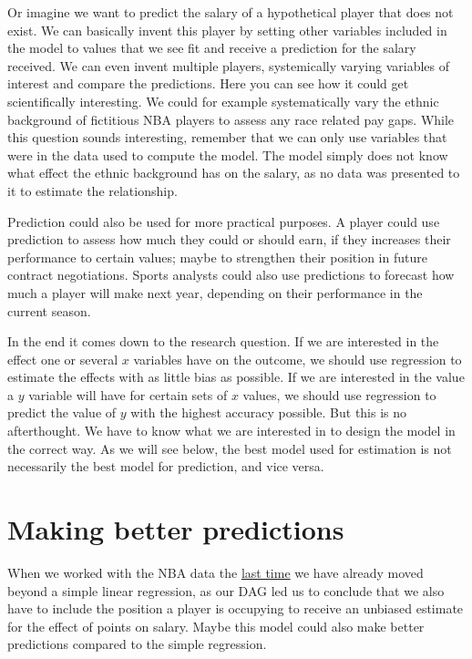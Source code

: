 \documentclass[
]{book}
\begin{document}
Or imagine we want to predict the salary of a hypothetical player that does not
exist. We can basically invent this player by setting other variables included
in the model to values that we see fit and receive a prediction for the salary
received. We can even invent multiple players, systemically varying variables of
interest and compare the predictions. Here you can see how it could get
scientifically interesting. We could for example systematically vary the ethnic
background of fictitious NBA players to assess any race related pay gaps. While
this question sounds interesting, remember that we can only use variables that
were in the data used to compute the model. The model simply does not know what
effect the ethnic background has on the salary, as no data was presented to it
to estimate the relationship.

Prediction could also be used for more practical purposes. A player could use
prediction to assess how much they could or should earn, if they increases their
performance to certain values; maybe to strengthen their position in future
contract negotiations. Sports analysts could also use predictions to forecast
how much a player will make next year, depending on their performance in the
current season.

In the end it comes down to the research question. If we are interested in the
effect one or several \(x\) variables have on the outcome, we should use
regression to estimate the effects with as little bias as possible. If we are
interested in the value a \(y\) variable will have for certain sets of \(x\) values,
we should use regression to predict the value of \(y\) with the highest accuracy
possible. But this is no afterthought. We have to know what we are interested
in to design the model in the correct way. As we will see below, the best model
used for estimation is not necessarily the best model for prediction, and vice
versa.

\hypertarget{making-better-predictions}{%
\section{Making better predictions}\label{making-better-predictions}}

When we worked with the NBA data the \protect\hyperlink{lin-a}{last time} we have already moved
beyond a simple linear regression, as our DAG led us to conclude that we also
have to include the position a player is occupying to receive an unbiased
estimate for the effect of points on salary. Maybe this model could also make
better predictions compared to the simple regression.
\end{document}
